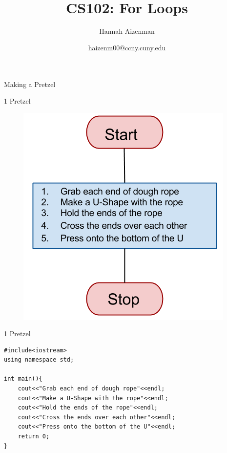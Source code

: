 \documentclass[xcolor={dvipsnames}]{beamer}
\begin{document}
\title{ CS102: For Loops }
\author{Hannah Aizenman}
\date{haizenm00@ccny.cuny.edu}


\begin{frame}
	\titlepage
\end{frame}

\begin{frame}{Making a Pretzel}
	\begin{center}
	\end{center}
\end{frame}

\begin{frame}{1 Pretzel}
	\begin{figure}
		\includegraphics[width=.75\textwidth]{one_pretzel}
	\end{figure}
\end{frame}
%
\begin{frame}[fragile]{1 Pretzel}
\begin{verbatim}
#include<iostream>
using namespace std;

int main(){
    cout<<"Grab each end of dough rope"<<endl;
    cout<<"Make a U-Shape with the rope"<<endl;
    cout<<"Hold the ends of the rope"<<endl;
    cout<<"Cross the ends over each other"<<endl;
    cout<<"Press onto the bottom of the U"<<endl;
    return 0;
}
\end{verbatim}
\end{frame}
\end{document}
